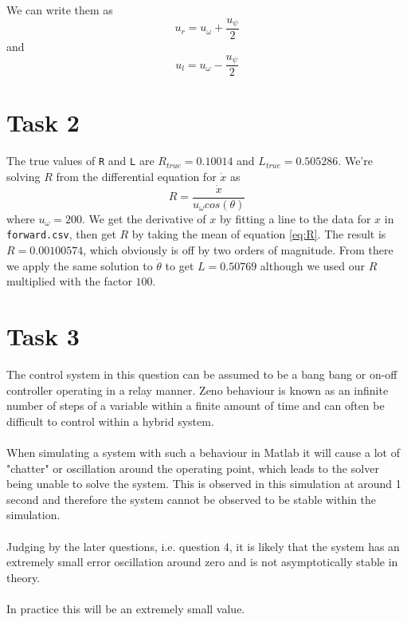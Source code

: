 \documentclass[a4paper,12pt,oneside,onecolumn]{article} %
\begin{document}
We can write them as
\begin{equation}
u_r = u_{\omega} + \frac{u_{\psi}}{2}
\end{equation}
and
\begin{equation}
u_l = u_{\omega} - \frac{u_{\psi}}{2}
\end{equation}

\section*{Task 2}

The true values of \texttt{R} and \texttt{L} are $R_{true} =0.10014 $ and $L_{true} = 0.505286$. We're solving $R$ from the differential equation for $\dot{x}$ as
\begin{equation}
\label{eq:R}
R = \frac{\dot{x}}{u_{\omega}cos(\theta)}
\end{equation}
where $u_{\omega} = 200$. We get the derivative of $x$ by fitting a line to the data for $x$ in \texttt{forward.csv}, then get $R$ by taking the mean of equation \ref{eq:R}. The result is $R = 0.00100574$, which obviously is off by two orders of magnitude. From there we apply the same solution to $\dot{\theta}$ to get $L = 0.50769$ although we used our $R$ multiplied with the factor $100$.

\section*{Task 3}

The control system in this question can be assumed to be a bang bang or on-off controller operating in a relay manner.  Zeno behaviour is known as an infinite number of steps of a variable within a finite amount of time and can often be difficult to control within a hybrid system.\\
\\
When simulating a system with such a behaviour in Matlab it will cause a lot of "chatter" or oscillation around the operating point, which leads to the solver being unable to solve the system. This is observed in this simulation at around 1 second and therefore the system cannot be observed to be stable within the simulation.\\
\\
Judging by the later questions, i.e. question 4, it is likely that the system has an extremely small error oscillation around zero and is not asymptotically stable in theory.\\
\\
In practice this will be an extremely small value.
\end{document}
